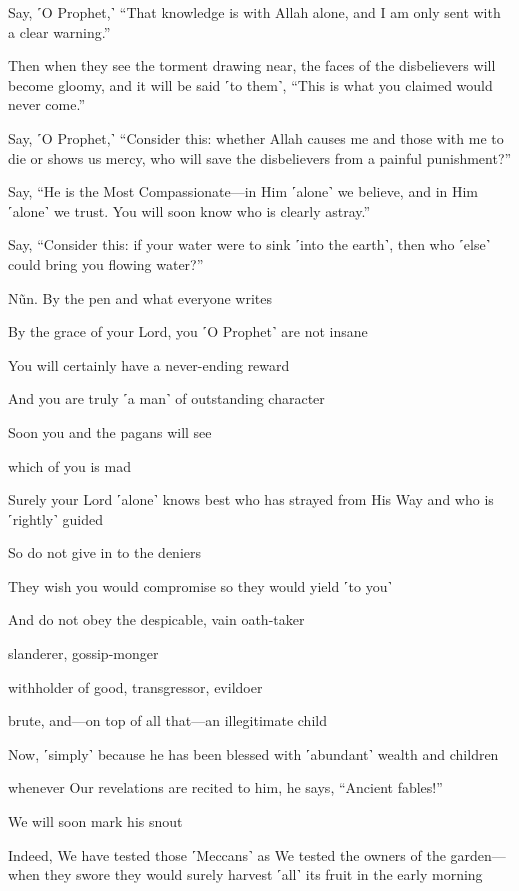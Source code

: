 Say, ˹O Prophet,˺ “That knowledge is with Allah alone, and I am only sent with a clear warning.”

Then when they see the torment drawing near, the faces of the disbelievers will become gloomy, and it will be said ˹to them˺, “This is what you claimed would never come.”

Say, ˹O Prophet,˺ “Consider this: whether Allah causes me and those with me to die or shows us mercy, who will save the disbelievers from a painful punishment?”

Say, “He is the Most Compassionate—in Him ˹alone˺ we believe, and in Him ˹alone˺ we trust. You will soon know who is clearly astray.”

Say, “Consider this: if your water were to sink ˹into the earth˺, then who ˹else˺ could bring you flowing water?”

Nũn. By the pen and what everyone writes

By the grace of your Lord, you ˹O Prophet˺ are not insane

You will certainly have a never-ending reward

And you are truly ˹a man˺ of outstanding character

Soon you and the pagans will see

which of you is mad

Surely your Lord ˹alone˺ knows best who has strayed from His Way and who is ˹rightly˺ guided

So do not give in to the deniers

They wish you would compromise so they would yield ˹to you˺

And do not obey the despicable, vain oath-taker

slanderer, gossip-monger

withholder of good, transgressor, evildoer

brute, and—on top of all that—an illegitimate child

Now, ˹simply˺ because he has been blessed with ˹abundant˺ wealth and children

whenever Our revelations are recited to him, he says, “Ancient fables!”

We will soon mark his snout

Indeed, We have tested those ˹Meccans˺ as We tested the owners of the garden—when they swore they would surely harvest ˹all˺ its fruit in the early morning

